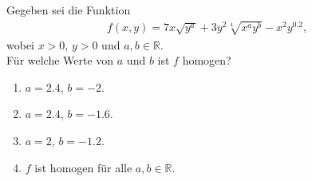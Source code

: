 \subsection*{}
Gegeben sei die Funktion
\begin{align*}
f(x,y) = 
7x\sqrt{y^a} + 3y^2 \sqrt[4]{x^a y^b} - x^2 y^{0.2},
\end{align*}
wobei $ x > 0 $, $ y > 0 $ und $ a,b \in \mathbb{R} $.\\
Für welche Werte von $ a $ und $ b $ ist $ f  $ homogen?
\renewcommand{\labelenumi}{(\alph{enumi})}
\begin{enumerate}
\item 
$a = 2.4$, $ b = -2 $.
\item
$a = 2.4$, $ b = -1.6 $.
\item
$a = 2$, $ b = -1.2 $.
\item
$ f  $ ist homogen für alle $ a,b \in \mathbb{R} $.
\end{enumerate}